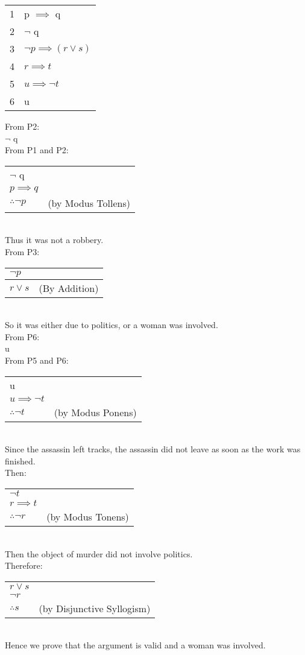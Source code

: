\documentclass[addpoints]{exam}
\begin{document}
\begin{questions}
\begin{solution}
\begin{tabularx}{\textwidth}{l@{ : }X}
      1 & p $\implies$ q \\
      2 & $\neg$ q \\
      3 & $ \neg p \implies (r \lor s) $ \\
      4 & $ r \implies t$ \\
      5 & $ u \implies \neg t$ \\
      6 & u
    \end{tabularx}
    From P2: \\
    $\neg$ q \\
    From P1 and P2: \\
    \begin{tabular}{ll}
      $ \neg $ q \\
      $ p \implies q $ \\\hline
      $ \therefore \neg p $ & (by Modus Tollens)
    \end{tabular}
    \\ Thus it was not a robbery. \\
    From P3: \\
    \begin{tabular}{ll}
      $ \neg p $ \\\hline
      $ r \lor s $ & (By Addition)
    \end{tabular}
    \\ So it was either due to politics, or a woman was involved. \\
    From P6: \\
    u \\
    From P5 and P6: \\
    \begin{tabular}{ll}
      u \\
      $ u \implies \neg t$ \\\hline
      $ \therefore \neg t $ & (by Modus Ponens)
    \end{tabular}
    \\ Since the assassin left tracks, the assassin did not leave as soon as the work was finished. \\
    Then: \\
    \begin{tabular}{ll}
      $\neg t$ \\
      $r \implies t$ \\\hline
      $ \therefore \neg r$ & (by Modus Tonens)
    \end{tabular}
    \\ Then the object of murder did not involve politics.\\
    Therefore: \\
    \begin{tabular}{ll}
      $r \lor s$ \\
      $\neg r$ \\\hline
      $ \therefore s $ & (by Disjunctive Syllogism)
    \end{tabular}
    \\Hence we prove that the argument is valid and a woman was involved.
  \end{solution}
  

\end{questions}
\end{document}
